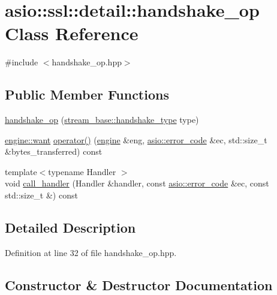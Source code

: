 \hypertarget{classasio_1_1ssl_1_1detail_1_1handshake__op}{}\section{asio\+:\+:ssl\+:\+:detail\+:\+:handshake\+\_\+op Class Reference}
\label{classasio_1_1ssl_1_1detail_1_1handshake__op}


{\ttfamily \#include $<$handshake\+\_\+op.\+hpp$>$}

\subsection*{Public Member Functions}
\begin{DoxyCompactItemize}
\item 
\hyperlink{classasio_1_1ssl_1_1detail_1_1handshake__op_a800c0bb3764e5422affa8d402de86adc}{handshake\+\_\+op} (\hyperlink{classasio_1_1ssl_1_1stream__base_a2f18813d3860bc8aee99249834d7c320}{stream\+\_\+base\+::handshake\+\_\+type} type)
\item 
\hyperlink{classasio_1_1ssl_1_1detail_1_1engine_ab9812153941a6a93c9095f4e5ca8f915}{engine\+::want} \hyperlink{classasio_1_1ssl_1_1detail_1_1handshake__op_a9113bc416170702197ff6a1b703b6fc7}{operator()} (\hyperlink{classasio_1_1ssl_1_1detail_1_1engine}{engine} \&eng, \hyperlink{classasio_1_1error__code}{asio\+::error\+\_\+code} \&ec, std\+::size\+\_\+t \&bytes\+\_\+transferred) const 
\item 
{\footnotesize template$<$typename Handler $>$ }\\void \hyperlink{classasio_1_1ssl_1_1detail_1_1handshake__op_a6b91526ae72ee6f69eff7942851e790e}{call\+\_\+handler} (Handler \&handler, const \hyperlink{classasio_1_1error__code}{asio\+::error\+\_\+code} \&ec, const std\+::size\+\_\+t \&) const 
\end{DoxyCompactItemize}


\subsection{Detailed Description}


Definition at line 32 of file handshake\+\_\+op.\+hpp.



\subsection{Constructor \& Destructor Documentation}
\hypertarget{classasio_1_1ssl_1_1detail_1_1handshake__op_a800c0bb3764e5422affa8d402de86adc}{}
